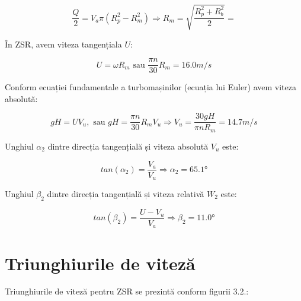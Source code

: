 \begin{equation}
\frac{Q}{2} = V_a \pi (R_p^2 - R_m^2) \Rightarrow{} R_m = \sqrt{\frac{R_p^2 + R_b^2}{2}} = 
\end{equation}

În ZSR, avem viteza tangențiala $U$:

\begin{equation}
U=\omega R_m \text{ sau } \frac{\pi n}{30} R_m=16.0\si{m/s}
\end{equation}

Conform ecuației fundamentale a turbomașinilor (ecuația lui Euler) avem viteza absolută:

\begin{equation}
gH=UV_{u}, \text{ sau } gH=\frac{\pi n}{30} R_m V_{u} \Rightarrow V_{u} = \frac{30gH}{\pi n R_m} = 14.7\si{m/s}
\end{equation}


Unghiul $\alpha_2$ dintre direcția tangențială și viteza absolută $V_u$ este:

\begin{equation}
tan(\alpha_{2 })=\frac{V_{a}}{V_{u}} \Rightarrow \alpha_{2}=65.1\si{\degree}
\end{equation}



Unghiul $\beta_2$ dintre direcția tangențială și viteza relativă $W_2$ este:

\begin{equation}
tan(\beta_{2})=\frac{U - V_u}{V_a} \Rightarrow \beta_{2} =11.0\si{\degree}
\end{equation}


\section{Triunghiurile de viteză}

Triunghiurile de viteză pentru ZSR se prezintă conform figurii 3.2.:

